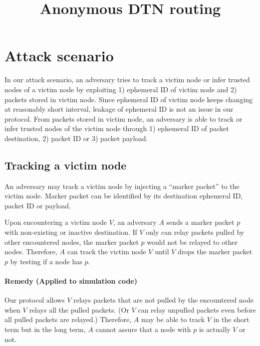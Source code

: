 \documentclass[11pt]{article}
\begin{document}
\title{Anonymous DTN routing}
\maketitle




\section{Attack scenario}
In our attack scenario, an adversary tries to track a victim node or infer trusted nodes of a victim node by exploiting 1) ephemeral ID of victim node and 2) packets stored in victim node.
Since ephemeral ID of victim node keeps changing at reasonably short interval, leakage of ephemeral ID is not an issue in our protocol. 
From packets stored in victim node, an adversary is able to track or infer trusted nodes of the victim node through 1) ephemeral ID of packet destination, 2) packet ID or 3) packet payload. 



\subsection{Tracking a victim node}
An adversary may track a victim node by injecting a ``marker packet'' to the victim node. 
Marker packet can be identified by its destination ephemeral ID, packet ID or payload.  


Upon encountering a victim node $V$, an adversary $A$ sends a marker packet $p$ with non-existing or inactive destination. 
If $V$ only can relay packets pulled by other encountered nodes, the marker packet $p$ would not be relayed to other nodes. 
Therefore, $A$ can track the victim node $V$ until $V$ drops the marker packet $p$ by testing if a node has $p$. 

\paragraph{Remedy (Applied to simulation code)}
Our protocol allows $V$ relays packets that are not pulled by the encountered node when $V$ relays all the pulled packets. 
(Or $V$ can relay unpulled packets even before all pulled packets are relayed.)
Therefore, $A$ may be able to track $V$ in the short term but in the long term, $A$ cannot assure that a node with $p$ is actually $V$ or not. 
\end{document}
